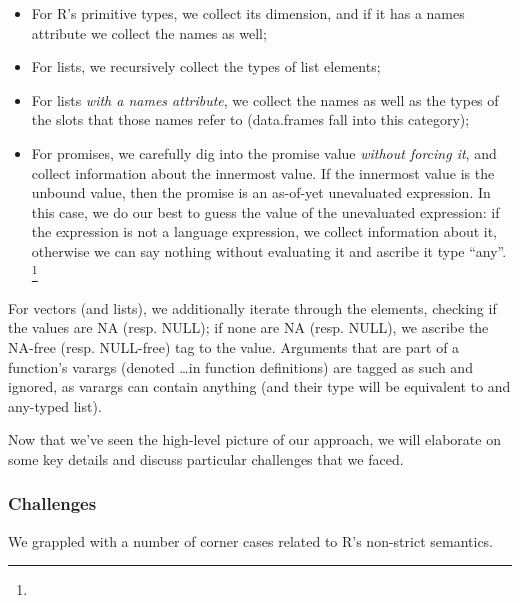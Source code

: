 \documentclass[acmsmall,review,anonymous]{acmart}\settopmatter{printfolios=true,printccs=false,printacmref=false}
\begin{document}
\begin{itemize}
\item For R's primitive types, we collect its dimension, and if it has a
  names attribute we collect the names as well;
\item For lists, we recursively collect the types of list elements;
\item For lists {\it with a names attribute}, we collect the names as well as the types of the slots that those names refer to (data.frames fall into this category);
\item For promises, we carefully dig into the promise value {\it without
  forcing it}, and collect information about the innermost value. If the
  innermost value is the unbound value, then the promise is an as-of-yet
  unevaluated expression. In this case, we do our best to guess the value of
  the unevaluated expression: if the expression is not a language
  expression, we collect information about it, otherwise we can say nothing
  without evaluating it and ascribe it type ``any''. \footnote{}
\end{itemize}

For vectors (and lists), we additionally iterate through the elements,
checking if the values are NA (resp. NULL); if none are NA (resp. NULL), we
ascribe the NA-free (resp. NULL-free) tag to the value.  Arguments that are
part of a function's varargs (denoted \ldots in function definitions) are
tagged as such and ignored, as varargs can contain anything (and their type
will be equivalent to and any-typed list).

Now that we've seen the high-level picture of our approach, we will elaborate on some key details and discuss particular challenges that we faced.

%
%
\subsubsection{Challenges}
\label{subsec:typetracer-challenges}

We grappled with a number of corner cases related to R's non-strict semantics.
\end{document}

